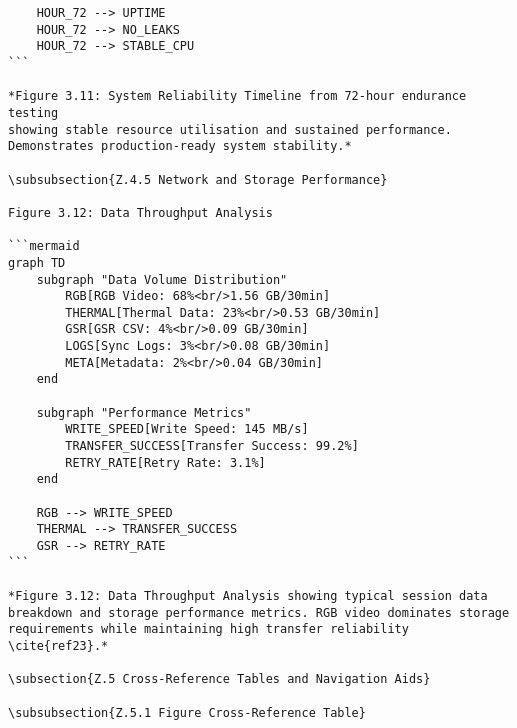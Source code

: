\begin{verbatim}
    HOUR_72 --> UPTIME
    HOUR_72 --> NO_LEAKS
    HOUR_72 --> STABLE_CPU
```

*Figure 3.11: System Reliability Timeline from 72-hour endurance testing
showing stable resource utilisation and sustained performance.
Demonstrates production-ready system stability.*

\subsubsection{Z.4.5 Network and Storage Performance}

Figure 3.12: Data Throughput Analysis

```mermaid
graph TD
    subgraph "Data Volume Distribution"
        RGB[RGB Video: 68%<br/>1.56 GB/30min]
        THERMAL[Thermal Data: 23%<br/>0.53 GB/30min]
        GSR[GSR CSV: 4%<br/>0.09 GB/30min]
        LOGS[Sync Logs: 3%<br/>0.08 GB/30min]
        META[Metadata: 2%<br/>0.04 GB/30min]
    end

    subgraph "Performance Metrics"
        WRITE_SPEED[Write Speed: 145 MB/s]
        TRANSFER_SUCCESS[Transfer Success: 99.2%]
        RETRY_RATE[Retry Rate: 3.1%]
    end

    RGB --> WRITE_SPEED
    THERMAL --> TRANSFER_SUCCESS
    GSR --> RETRY_RATE
```

*Figure 3.12: Data Throughput Analysis showing typical session data
breakdown and storage performance metrics. RGB video dominates storage
requirements while maintaining high transfer reliability \cite{ref23}.*

\subsection{Z.5 Cross-Reference Tables and Navigation Aids}

\subsubsection{Z.5.1 Figure Cross-Reference Table}


\end{verbatim}
